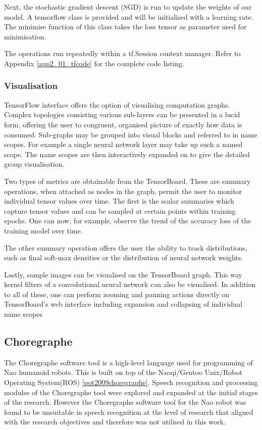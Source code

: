 Next, the stochastic gradient descent (SGD) is run to update the weights of our model.  A tensorflow class is provided and will be initialised with a learning rate.  The minimise function of this class takes the loss tensor as parameter used for minimisation.

The operations run repeatedly within a tf.Session context manager. Refer to Appendix \ref{app2_01_tfcode} for the complete code listing.

\subsubsection{Visualisation}
TensorFlow interface offers the option of visualising computation graphs. Complex topologies consisting various sub-layers can be presented in a lucid form, offering the user to congruent, organised picture of exactly how data is consumed. Sub-graphs may be grouped into visual blocks and referred to in name scopes.  For example a single neural network layer may take up such a named scope. The name scopes are then interactively expanded on to give the detailed group visualisation.

Two types of metrics are obtainable from the TensorBoard. These are summary operations, when attached as nodes in the graph, permit the user to monitor individual tensor values over time.   The first is the scalar summaries which capture tensor values and can be sampled at certain points within training epochs. One can now, for example, observe the trend of the accuracy loss of the training model over time.

The other summary operation offers the user the ability to track distributions, such as final soft-max densities or the distribution of neural network weights. 

Lastly, sample images can be visualised on the TensorBoard graph. This way kernel filters of a convolutional neural network can also be visualised.  In addition to all of these, one can perform zooming and panning actions directly on TensorBoard's web interface including expansion and collapsing of individual name scopes

\subsection{Choregraphe}
The Choregraphe software tool is a high-level language used for programming of Nao humanoid robots.  This is built on top of the Naoqi/Gentoo Unix/Robot Operating System(ROS) \ref{pot2009choregraphe}.  Speech recognition and processing modules of the Choregraphe tool were explored and expanded at the initial stages of the research.  However the Choregraphe software tool for the Nao robot was found to be unsuitable in speech recognition at the level of research that aligned with the research objectives and therefore was not utilised in this work.


